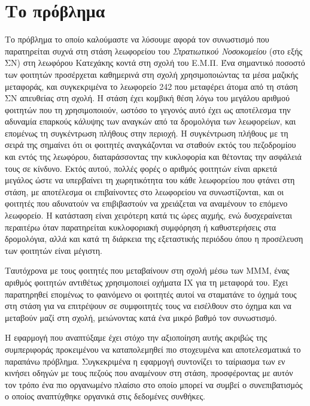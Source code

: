 \documentclass[../thesis.tex]{subfiles}
\begin{document}
\section{Το πρόβλημα}
Το πρόβλημα το οποίο καλούμαστε να λύσουμε αφορά τον συνωστισμό που παρατηρείται συχνά στη στάση λεωφορείου του \textit{Στρατιωτικού Νοσοκομείου} (στο εξής ΣΝ) στη λεωφόρου Κατεχάκης κοντά στη σχολή του Ε.Μ.Π.
Ένα σημαντικό ποσοστό των φοιτητών προσέρχεται καθημερινά στη σχολή χρησιμοποιώντας τα μέσα μαζικής μεταφοράς, και συγκεκριμένα το λεωφορείο 242 που μεταφέρει άτομα από τη στάση ΣΝ απευθείας στη σχολή.
Η στάση έχει κομβική θέση λόγω του μεγάλου αριθμού φοιτητών που τη χρησιμοποιούν, ωστόσο το γεγονός αυτό έχει ως αποτέλεσμα την αδυναμία επαρκούς κάλυψης των αναγκών από τα δρομολόγια των λεωφορείων, και επομένως τη συγκέντρωση πλήθους στην περιοχή.
Η συγκέντρωση πλήθους με τη σειρά της σημαίνει ότι οι φοιτητές αναγκάζονται να σταθούν εκτός του πεζοδρομίου και εντός της λεωφόρου, διαταράσσοντας την κυκλοφορία και θέτοντας την ασφάλειά τους σε κίνδυνο.
Εκτός αυτού, πολλές φορές ο αριθμός φοιτητών είναι αρκετά μεγάλος ώστε να υπερβαίνει τη χωρητικότητα του κάθε λεωφορείου που φτάνει στη στάση, με αποτέλεσμα οι επιβαίνοντες στο λεωφορείου να συνωστίζονται, και οι φοιτητές που αδυνατούν να επιβιβαστούν να χρειάζεται να αναμένουν το επόμενο λεωφορείο.
Η κατάσταση είναι χειρότερη κατά τις ώρες αιχμής, ενώ δυσχεραίνεται περαιτέρω όταν παρατηρείται κυκλοφοριακή συμφόρηση ή καθυστερήσεις στα δρομολόγια, αλλά και κατά τη διάρκεια της εξεταστικής περιόδου όπου η προσέλευση των φοιτητών είναι μέγιστη.

Ταυτόχρονα με τους φοιτητές που μεταβαίνουν στη σχολή μέσω των ΜΜΜ, ένας αριθμός φοιτητών αντιθέτως χρησιμοποιεί οχήματα ΙΧ για τη μεταφορά του.
Έχει παρατηρηθεί επομένως το φαινόμενο οι φοιτητές αυτοί να σταματάνε το όχημά τους στη στάση για να επιτρέψουν σε συμφοιτητές τους να εισέλθουν στο όχημα και να μεταβούν μαζί στη σχολή, μειώνοντας κατά ένα μικρό βαθμό τον συνωστισμό.

Η εφαρμογή που αναπτύξαμε έχει στόχο την αξιοποίηση αυτής ακριβώς της συμπεριφοράς προκειμένου να καταπολεμηθεί πιο στοχευμένα και αποτελεσματικά το παραπάνω πρόβλημα.
Συγκεκριμένα η εφαρμογή συντονίζει το ταίριασμα των εν κινήσει οδηγών με τους πεζούς που αναμένουν στη στάση, προσφέροντας με αυτόν τον τρόπο ένα πιο οργανωμένο πλαίσιο στο οποίο μπορεί να συμβεί ο συνεπιβατισμός ο οποίος αναπτύχθηκε οργανικά στις δεδομένες συνθήκες.
\end{document}
